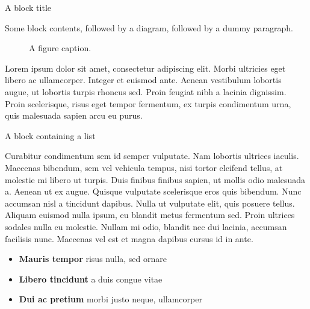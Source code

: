 

\begin{frame}[t]
\begin{columns}[t]
\separatorcolumn

\begin{column}{\colwidth}

  \begin{block}{A block title}

    Some block contents, followed by a diagram, followed by a dummy paragraph.

    \begin{figure}
      \centering
      \caption{A figure caption.}
    \end{figure}

    Lorem ipsum dolor sit amet, consectetur adipiscing elit. Morbi ultricies
    eget libero ac ullamcorper. Integer et euismod ante. Aenean vestibulum
    lobortis augue, ut lobortis turpis rhoncus sed. Proin feugiat nibh a
    lacinia dignissim. Proin scelerisque, risus eget tempor fermentum, ex
    turpis condimentum urna, quis malesuada sapien arcu eu purus.

  \end{block}

  \begin{block}{A block containing a list}

    Curabitur condimentum sem id semper vulputate. Nam lobortis ultrices
    iaculis. Maecenas bibendum, sem vel vehicula tempus, nisi tortor eleifend
    tellus, at molestie mi libero ut turpis. Duis finibus finibus sapien, ut
    mollis odio malesuada a. Aenean ut ex augue. Quisque vulputate scelerisque
    eros quis bibendum. Nunc accumsan nisl a tincidunt dapibus. Nulla ut
    vulputate elit, quis posuere tellus. Aliquam euismod nulla ipsum, eu
    blandit metus fermentum sed. Proin ultrices sodales nulla eu molestie.
    Nullam mi odio, blandit nec dui lacinia, accumsan facilisis nunc. Maecenas
    vel est et magna dapibus cursus id in ante.

    \begin{itemize}
      \item \textbf{Mauris tempor} risus nulla, sed ornare
      \item \textbf{Libero tincidunt} a duis congue vitae
      \item \textbf{Dui ac pretium} morbi justo neque, ullamcorper
    \end{itemize}


\end{block}
\end{column}
\end{columns}
\end{frame}
